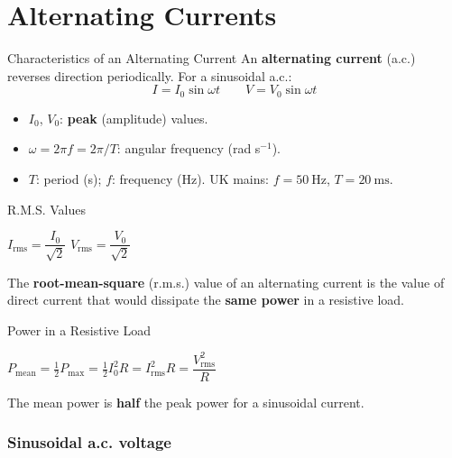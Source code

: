 \section{Alternating Currents}

\begin{definitionbox}{Characteristics of an Alternating Current}
An \textbf{alternating current} (a.c.) reverses direction periodically. For a sinusoidal a.c.:
$$I = I_0\sin\omega t \qquad V = V_0\sin\omega t$$
\begin{itemize}[itemsep=2pt]
  \item $I_0$, $V_0$: \textbf{peak} (amplitude) values.
  \item $\omega = 2\pi f = 2\pi/T$: angular frequency (rad s$^{-1}$).
  \item $T$: period (s); $f$: frequency (Hz). UK mains: $f = 50\ \text{Hz}$, $T = 20\ \text{ms}$.
\end{itemize}
\end{definitionbox}

\begin{formulabox}{R.M.S. Values}
\begin{center}
\Large $I_{\text{rms}} = \dfrac{I_0}{\sqrt{2}}$ \qquad $V_{\text{rms}} = \dfrac{V_0}{\sqrt{2}}$
\end{center}
\vspace{0.3em}
The \textbf{root-mean-square} (r.m.s.) value of an alternating current is the value of direct current that would dissipate the \textbf{same power} in a resistive load.
\end{formulabox}

\begin{formulabox}{Power in a Resistive Load}
\begin{center}
\large $P_{\text{mean}} = \tfrac{1}{2}P_{\text{max}} = \tfrac{1}{2}I_0^2 R = I_{\text{rms}}^2 R = \dfrac{V_{\text{rms}}^2}{R}$
\end{center}
\vspace{0.3em}
The mean power is \textbf{half} the peak power for a sinusoidal current.
\end{formulabox}

\subsubsection*{Sinusoidal a.c. voltage}

